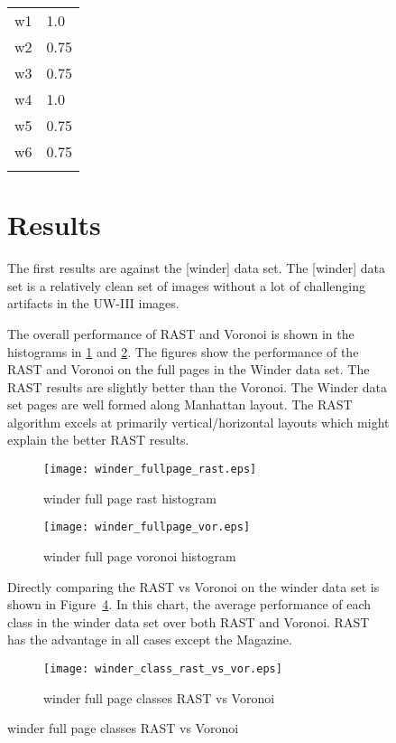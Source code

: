 \documentclass[conference]{IEEEtran}
\begin{document}
\begin{figure}[table-weights]
\begin{tabular}{|r|l|}
\hline
    w1 & 1.0  \\
    w2 & 0.75 \\
    w3 & 0.75 \\
    w4 & 1.0  \\
    w5 & 0.75 \\
    w6 & 0.75 \\
\hline
\label{table:table-weights}
\end{tabular}

\section{Results}
The first results are against the [winder] data set. The [winder] data set is a
relatively clean set of images without a lot of challenging artifacts in the
UW-III images.

The overall performance of RAST and Voronoi is shown in the histograms in
\ref{fig:winder-fullpage-rast} and \ref{fig:winder-fullpage-vor}. The figures
show the performance of the RAST and Voronoi on the full pages in the Winder
data set. The RAST results are slightly better than the Voronoi. The Winder
data set pages are well formed along Manhattan layout. The RAST algorithm
excels at primarily vertical/horizontal layouts which might explain the better
RAST results.

\begin{figure}[winder-fullpage-rast]
\texttt{[image: winder\_fullpage\_rast.eps]}
\caption{winder full page rast histogram}
\label{fig:winder-fullpage-rast}
\end{figure}

\begin{figure}[winder-fullpage-vor]
\texttt{[image: winder\_fullpage\_vor.eps]}
\caption{winder full page voronoi histogram}
\label{fig:winder-fullpage-vor}
\end{figure}

Directly comparing the RAST vs Voronoi on the winder data set is shown in
Figure~\ref{fig:winder-class-rast-vs-vor}. In this chart, the average
performance of each class in the winder data set over both RAST and Voronoi.
RAST has the advantage in all cases except the Magazine. 

\begin{figure}[winder-class-rast-vs-vor]
\texttt{[image: winder\_class\_rast\_vs\_vor.eps]}
\caption{winder full page classes RAST vs Voronoi}
\label{fig:winder-class-rast-vs-vor}
\end{figure}


\end{figure}
\end{document}
